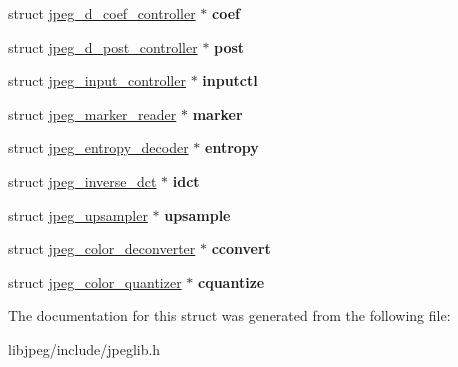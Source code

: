 \begin{DoxyCompactItemize}
\item 
\hypertarget{structjpeg__decompress__struct_ac0cea854c2daaae7310ccb9ebd16ef9e}{struct \hyperlink{structjpeg__d__coef__controller}{jpeg\-\_\-d\-\_\-coef\-\_\-controller} $\ast$ {\bfseries coef}}\label{structjpeg__decompress__struct_ac0cea854c2daaae7310ccb9ebd16ef9e}

\item 
\hypertarget{structjpeg__decompress__struct_a5cc30c995d7f5e47b2f03b3d3eb295b5}{struct \hyperlink{structjpeg__d__post__controller}{jpeg\-\_\-d\-\_\-post\-\_\-controller} $\ast$ {\bfseries post}}\label{structjpeg__decompress__struct_a5cc30c995d7f5e47b2f03b3d3eb295b5}

\item 
\hypertarget{structjpeg__decompress__struct_a90488cdeedacfd4fb1d881fe93c145e8}{struct \hyperlink{structjpeg__input__controller}{jpeg\-\_\-input\-\_\-controller} $\ast$ {\bfseries inputctl}}\label{structjpeg__decompress__struct_a90488cdeedacfd4fb1d881fe93c145e8}

\item 
\hypertarget{structjpeg__decompress__struct_a18f7650cc9455ea5aec62eff169d4933}{struct \hyperlink{structjpeg__marker__reader}{jpeg\-\_\-marker\-\_\-reader} $\ast$ {\bfseries marker}}\label{structjpeg__decompress__struct_a18f7650cc9455ea5aec62eff169d4933}

\item 
\hypertarget{structjpeg__decompress__struct_a4386bd132276d7d3982bdbfbf3604bb7}{struct \hyperlink{structjpeg__entropy__decoder}{jpeg\-\_\-entropy\-\_\-decoder} $\ast$ {\bfseries entropy}}\label{structjpeg__decompress__struct_a4386bd132276d7d3982bdbfbf3604bb7}

\item 
\hypertarget{structjpeg__decompress__struct_a9718bb2ceea857e72da381ed53aa514a}{struct \hyperlink{structjpeg__inverse__dct}{jpeg\-\_\-inverse\-\_\-dct} $\ast$ {\bfseries idct}}\label{structjpeg__decompress__struct_a9718bb2ceea857e72da381ed53aa514a}

\item 
\hypertarget{structjpeg__decompress__struct_a57799662d4378d759465fc52ccabac67}{struct \hyperlink{structjpeg__upsampler}{jpeg\-\_\-upsampler} $\ast$ {\bfseries upsample}}\label{structjpeg__decompress__struct_a57799662d4378d759465fc52ccabac67}

\item 
\hypertarget{structjpeg__decompress__struct_a52cb89e32b4bafff9f0098054110ea6c}{struct \hyperlink{structjpeg__color__deconverter}{jpeg\-\_\-color\-\_\-deconverter} $\ast$ {\bfseries cconvert}}\label{structjpeg__decompress__struct_a52cb89e32b4bafff9f0098054110ea6c}

\item 
\hypertarget{structjpeg__decompress__struct_a052fe066fbef4377b6d8a37d27b742c1}{struct \hyperlink{structjpeg__color__quantizer}{jpeg\-\_\-color\-\_\-quantizer} $\ast$ {\bfseries cquantize}}\label{structjpeg__decompress__struct_a052fe066fbef4377b6d8a37d27b742c1}

\end{DoxyCompactItemize}


The documentation for this struct was generated from the following file\-:\begin{DoxyCompactItemize}
\item 
libjpeg/include/jpeglib.\-h\end{DoxyCompactItemize}
